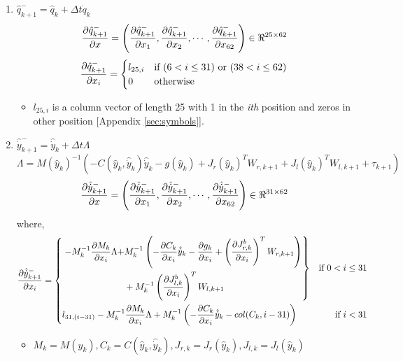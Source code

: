 \begin{enumerate}
\item $\hat{q}_{k+1}^- = \hat{q}_k + \Delta t \dot{q}_k $
\begin{equation}
\label{eq:dqdx}
\frac{\partial {\hat{q}_{k+1}^-}}{\partial {x}} = \left(\frac{\partial {\hat{q}_{k+1}^-}}{\partial {x_{1}}}, \frac{\partial {\hat{q}_{k+1}^-}}{\partial {x_{2}}}, \cdots , \frac{\partial {\hat{q}_{k+1}^-}}{\partial {x_{62}}}\right) \in \Re^{25 \times 62}
\end{equation}
\[
\frac{\partial {\hat{q}_{k+1}^-}}{\partial {x_{i}}} = 
	\begin{cases}
	l_{25,i} & \text{if } (6 < i \leq 31) \text{ or } (38 < i \leq 62) \\
	0 & \text{otherwise}   \\
	\end{cases}
\]
\begin{itemize}
\item $l_{25,i}$ is a column vector of length 25 with 1 in the \emph{ith} position and zeros in other position [Appendix \ref{sec:symbols}].
\end{itemize}
\item $\hat{\dot{y}}_{k+1}^- = \hat{\dot{y}}_{k}+ \Delta t \Lambda $
$$\Lambda = M(\hat{y}_{k})^{-1}(-C(\hat{y}_{k},\hat{\dot{y}}_{k})\hat{\dot{y}}_{k} - g(\hat{y}_{k}) + J_r(\hat{y}_{k})^{T}W_{r,k+1} +J_l(\hat{y}_{k})^{T}W_{l,k+1} + \tau_{k+1})$$
 \begin{equation}
 \label{eq:dydx}
\frac{\partial {\hat{\dot{y}}_{k+1}^-}}{\partial {x}} = \left(\frac{\partial {\hat{\dot{y}}_{k+1}^-}}{\partial {x_{1}}}, \frac{\partial {\hat{\dot{y}}_{k+1}^-}}{\partial {x_{2}}}, \cdots , \frac{\partial {\hat{\dot{y}}_{k+1}^-}}{\partial {x_{62}}}\right) \in \Re^{31 \times 62}
\end{equation}
where,
\[
\frac{\partial {\hat{\dot{y}}_{k+1}^-}}{\partial {x_{i}}} = 
\left\{ 
\!\begin{aligned}
	& \left. \!\begin{aligned}
	-M_k^{-1}\frac{\partial {M_k}}{\partial {x_{i}}}\Lambda + &M_k^{-1}\left(-\frac{\partial {C_k}}{\partial {x_{i}}}\hat{\dot{y}}_{k} -\frac{\partial {g_k}}{\partial {x_{i}}}        + \left(\frac{\partial {J_{r,k}^{b}}}{\partial {x_{i}}}\right)^{T}W_{r,k+1}\right) \\
	& + M_k^{-1}\left(\frac{\partial {J_{l,k}^{b}}}{\partial {x_{i}}}\right)^{T}W_{l,k+1}
	\end{aligned} \right\}& \text{if } 0 < i \leq 31 \\
&l_{31,(i-31)}-M_k^{-1}\frac{\partial {M_k}}{\partial {x_{i}}}\Lambda + M_k^{-1}\left(-\frac{\partial {C_k}}{\partial {x_{i}}}\hat{\dot{y}}_{k}- col(C_k,i-31)\right) & \text{if } i < 31  \\
\end{aligned}
\right.
\]
\begin{itemize}
\item $M_k= M(\hat{y}_{k}),C_k=C(\hat{y}_{k},\hat{\dot{y}}_k),J_{r,k}=J_r(\hat{y}_{k}),J_{l,k}=J_l(\hat{y}_{k})$

\end{itemize}
\end{enumerate}
